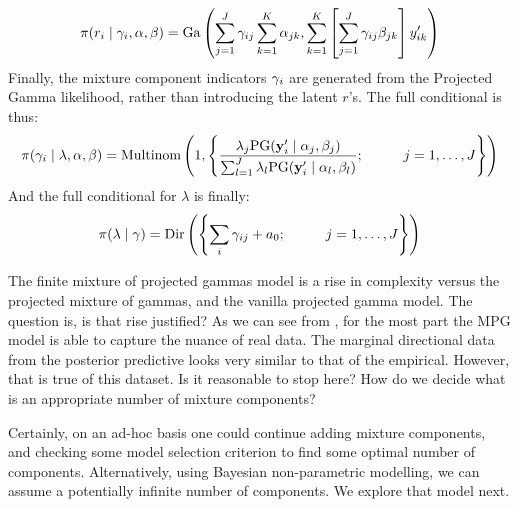 \begin{equation}
\pi(r_i\mid{\bf \gamma}_i, {\bf \alpha}, {\bf \beta}) = \text{Ga}\left(\sum_{j = 1}^J\gamma_{ij}\sum_{k = 1}^K\alpha_{jk}, \sum_{k = 1}^K\left[\sum_{j = 1}^J\gamma_{ij}\beta_{jk}\right]y_{ik}^{\prime}\right)
\end{equation}
Finally, the mixture component indicators ${\bf \gamma}_i$ are generated from
  the Projected Gamma likelihood, rather than introducing the latent $r$'s.
  The full conditional is thus:
\begin{equation}
\pi({\bf \gamma}_i\mid {\bf \lambda},{\bf \alpha},{\bf \beta}) = \text{Multinom}\left(1, \left\lbrace\frac{\lambda_j\text{PG}({\bf y}_i^{\prime}\mid{\bf \alpha}_j,{\bf \beta}_j)}{\sum_{l = 1}^J\lambda_l\text{PG}({\bf y}_i^{\prime}\mid{\bf \alpha}_l,{\bf \beta}_l)}; \hspace{1cm}j = 1,\ldots,J\right\rbrace\right)
\end{equation}
And the full conditional for $\lambda$ is finally:
\begin{equation}
\pi({\bf \lambda}\mid{\bf \gamma}) = \text{Dir}\left(
\left\lbrace \sum_i\gamma_{ij} + a_0; \hspace{1cm}j = 1,\ldots,J\right\rbrace\right)
\end{equation}

The finite mixture of projected gammas model is a rise in complexity versus
  the projected mixture of gammas, and the vanilla projected gamma model.  The
  question is, is that rise justified?  As we can see from ,
  for the most part the MPG model is able to capture the nuance of real data.
  The marginal directional data from the posterior predictive looks very similar
  to that of the empirical.  However, that is true of this dataset.  Is it
  reasonable to stop here?  How do we decide what is an appropriate number of
  mixture components?

Certainly, on an ad-hoc basis one could continue adding mixture components,
  and checking some model selection criterion to find some optimal number of
  components.  Alternatively, using Bayesian non-parametric modelling, we can
  assume a potentially infinite number of components.  We explore that model
  next.

